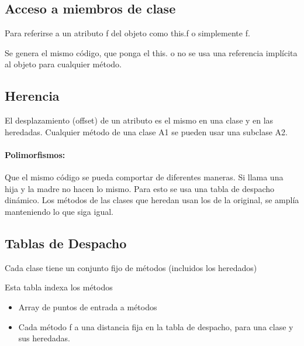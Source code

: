 \documentclass[12pt, twoside, openright]{report} %
\begin{document}
\subsection{Acceso a miembros de clase}
Para referirse a un atributo f del objeto como this.f o simplemente f.

Se genera el mismo código, que ponga el this. o no se usa una referencia implícita al objeto para cualquier método.

\subsection{Herencia}
El desplazamiento (offset) de un atributo es el mismo en una clase y en las heredadas. Cualquier método de una clase A1 se pueden usar una subclase A2.

\paragraph{Polimorfismos:} Que el mismo código se pueda comportar de diferentes maneras. Si llama una hija y la madre no hacen lo mismo. Para esto se usa una tabla de despacho dinámico.
Los métodos de las clases que heredan usan los de la original, se amplía manteniendo lo que siga igual.
\pagebreak
\subsection{Tablas de Despacho}
Cada clase tiene un conjunto fijo de métodos (incluidos los heredados)

Esta tabla indexa los métodos
\begin{itemize}
	\item Array de puntos de entrada a métodos
	\item Cada método f a una distancia fija en la tabla de despacho, para una clase y sus heredadas.
\end{itemize}
\end{document}
